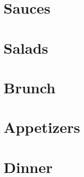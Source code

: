 \documentclass[oneside]{recipe}
\begin{document}
\chapter{Sauces}


\chapter{Salads}


\chapter{Brunch}


\chapter{Appetizers}


\chapter{Dinner}

\end{document}
